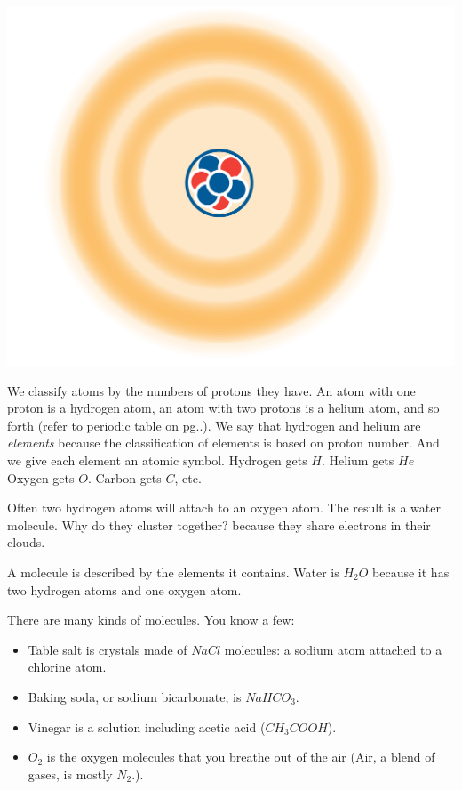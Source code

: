 \includegraphics[width=1\textwidth]{atomCloud.png}


We classify atoms by the numbers of protons they have. An atom with one proton is a
hydrogen atom, an atom with two protons is a helium atom, and so forth (refer to periodic table on pg..). We say that hydrogen and helium are \textit{elements} because the classification of elements is based on proton number. And we give
each element an atomic symbol. Hydrogen gets $H$. Helium gets $He$ Oxygen gets
$O$. Carbon gets $C$, etc.

Often two hydrogen atoms will attach to an oxygen atom. The result is
a water molecule. Why do they cluster together? because they share 
electrons in their clouds.

A molecule is described by the elements it contains. Water is $H_2O$
because it has two hydrogen atoms and one oxygen atom.

There are many kinds of molecules. You know a few:
\begin{itemize}
\item Table salt is crystals made of $NaCl$ molecules: a sodium atom attached to a chlorine atom.
\item Baking soda, or sodium bicarbonate, is $NaHCO_3$.
\item Vinegar is a solution including acetic acid ($CH_3COOH$).
\item $O_2$ is the oxygen molecules that you breathe out of the air (Air, a blend of gases, is mostly $N_2$.).
\end{itemize}

